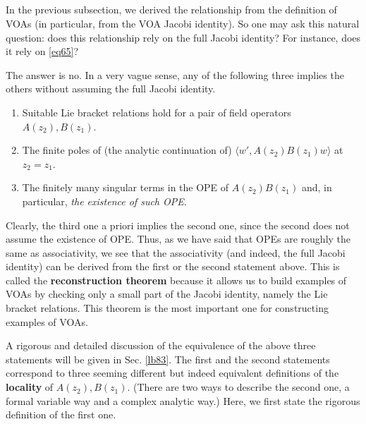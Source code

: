 \documentclass[12pt,a4paper,notitlepage]{article}
\theoremstyle{definition}
\theoremstyle{plain}
\newcommand{\bk}[1]{\langle {#1}\rangle}
\numberwithin{equation}{section}
\begin{document}
\subsection{}\label{lb57}

In the previous subsection, we derived the relationship from the definition of VOAs (in particular, from the VOA Jacobi identity). So one may ask this natural question: does this relationship rely on the full Jacobi identity? For instance, does it rely on \eqref{eq65}?

The answer is no. In a very vague sense, any of the following three implies the others without assuming the full Jacobi identity.
\begin{enumerate}
\item Suitable Lie bracket relations hold for a pair of field operators $A(z_2),B(z_1)$.
\item The finite poles of (the analytic continuation of) $\bk{w',A(z_2)B(z_1)w}$ at $z_2=z_1$.
\item The finitely many singular terms in the OPE of $A(z_2)B(z_1)$ and, in particular, \emph{the existence of such OPE}.
\end{enumerate}
Clearly, the third one a priori implies the second one, since the second does not assume the existence of OPE. Thus, as we have said that OPEs are roughly the same as associativity, we see that the associativity (and indeed, the full Jacobi identity) can be derived from the first or the second statement above. This is called the \textbf{reconstruction theorem} because it allows us to build examples of VOAs by checking only a small part of the Jacobi identity, namely the Lie bracket relations. This theorem is the most important one for constructing examples of VOAs.

A rigorous and detailed discussion of the equivalence of the above three statements will be given in Sec. \ref{lb83}. The first and the second statements correspond to three seeming different but indeed equivalent definitions of the \textbf{locality} of $A(z_2),B(z_1)$. (There are two ways to describe the second one, a formal variable way and a complex analytic way.) Here, we first state the rigorous definition of the first one.



\subsection{}
\end{document}
